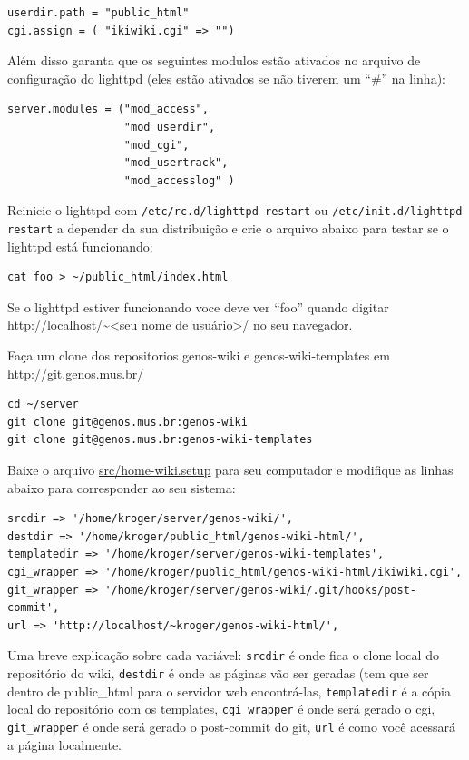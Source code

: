 \documentclass[12pt,brazil]{book}
\newcommand{\code}[1]{\texttt{#1}}
\begin{document}
\begin{verbatim}
userdir.path = "public_html"
cgi.assign = ( "ikiwiki.cgi" => "")
\end{verbatim}

Além disso garanta que os seguintes modulos estão ativados no arquivo
de configuração do lighttpd (eles estão ativados se não tiverem um
``\#'' na linha):

\begin{verbatim}
server.modules = ("mod_access",
                  "mod_userdir",
                  "mod_cgi",
                  "mod_usertrack",
                  "mod_accesslog" )
\end{verbatim}

Reinicie o lighttpd com \code{/etc/rc.d/lighttpd restart} ou
\code{/etc/init.d/lighttpd restart} a depender da sua distribuição e
crie o arquivo abaixo para testar se o lighttpd está funcionando:

\begin{verbatim}
cat foo > ~/public_html/index.html
\end{verbatim}

Se o lighttpd estiver funcionando voce deve ver ``foo'' quando digitar
\url{http://localhost/~<seu nome de usuário>/} no seu navegador.

Faça um clone dos repositorios genos-wiki e genos-wiki-templates em
\url{http://git.genos.mus.br/}

\begin{verbatim}
cd ~/server
git clone git@genos.mus.br:genos-wiki
git clone git@genos.mus.br:genos-wiki-templates
\end{verbatim}

Baixe o arquivo \url{src/home-wiki.setup} para seu computador e
modifique as linhas abaixo para corresponder ao seu sistema:

\begin{verbatim}
srcdir => '/home/kroger/server/genos-wiki/',
destdir => '/home/kroger/public_html/genos-wiki-html/',
templatedir => '/home/kroger/server/genos-wiki-templates',
cgi_wrapper => '/home/kroger/public_html/genos-wiki-html/ikiwiki.cgi',
git_wrapper => '/home/kroger/server/genos-wiki/.git/hooks/post-commit',
url => 'http://localhost/~kroger/genos-wiki-html/',
\end{verbatim}

Uma breve explicação sobre cada variável: \code{srcdir} é onde fica o
clone local do repositório do wiki, \code{destdir} é onde as páginas
vão ser geradas (tem que ser dentro de public\_html para o servidor
web encontrá-las, \code{templatedir} é a cópia local do repositório
com os templates, \code{cgi\_wrapper} é onde será gerado o cgi,
\code{git\_wrapper} é onde será gerado o post-commit do git,
\code{url} é como você acessará a página localmente.
\end{document}
